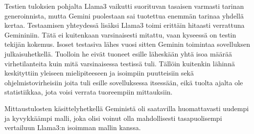 Testien tuloksien pohjalta Llama3 vaikutti suorituvan tasaisen varmasti tarinan
generoinnista, mutta Gemini puolestaan sai tuotettua enemmän tarinaa yhdellä
kertaa. Testaamisen yhteydessä lisäksi Llama3 toimi erittäin hitaasti
verrattuna Gemininiin. Tätä ei kuitenkaan varsinaisesti mitattu, vaan kyseessä
on testin tekijän kokemus. Isoset testasiva lähes vuosi sitten Geminin
toimintaa sovelluksen julkaisuhetkellä. Tuolloin he eivät tuoneet esille
läheskään yhtä isoa määrää virhetilanteita kuin mitä varsinaisessa testissä
tuli. Tällöin kuitenkin lähinnä keskityttiin yleiseen mielipiteeseen ja
isoimpiin puutteisiin sekä ohjelmistovirheisiin joita tuli esille sovelluksessa
itsessään, eikä tuolta ajalta ole statistiikkaa, jota voisi verrata tuoreempiin
mittauksiin.

Mittaustulosten käsittelyhetkellä Geministä oli saatavilla huomattavasti
uudempi ja kyvykkäämpi malli, joka olisi voinut olla mahdollisesti
tasapuolisempi vertailuun Llama3:n isoimman mallin kanssa. \parencite{gemini2}
